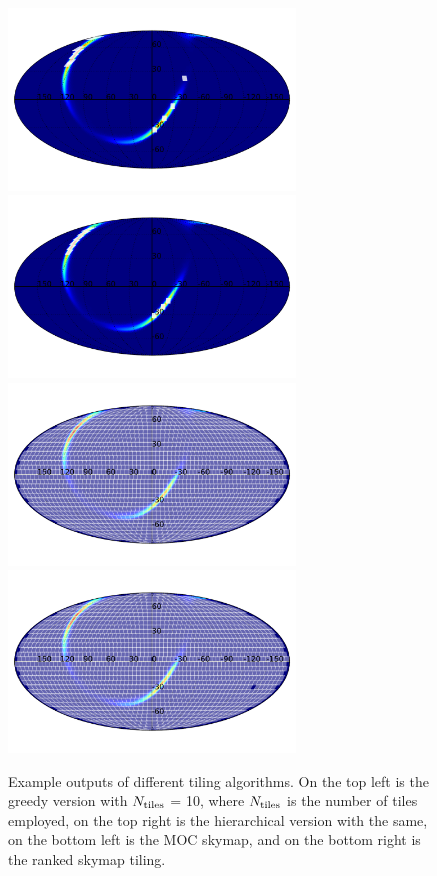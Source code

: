 \documentclass[twocolumn]{aastex61}
\begin{document}
\begin{figure}
    \centering
    \includegraphics[width=3in]{tiling_greedy}
    \includegraphics[width=3in]{tiling_hierarchical}
    \includegraphics[width=3in]{tiling_moc}
    \includegraphics[width=3in]{tiling_ranked}
    \caption{Example outputs of different tiling algorithms. On the top left is the greedy version with $N_{\rm tiles}$ = 10, where $N_{\rm tiles}$ is the number of tiles employed, on the top right is the hierarchical version with the same, on the bottom left is the MOC skymap, and on the bottom right is the ranked skymap tiling.}
    \label{fig:tiling}
\end{figure}
\end{document}
